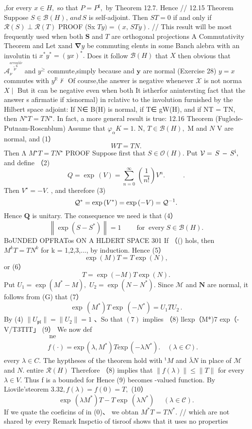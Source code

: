 ,for every $x\in H,$ so that $P=P^{\sharp},$ by Theorem 12.7. Hence // 12.15 Theorem Suppose $S\in{\mathcal{B}}(H),\,a n d\,S$ is self-adjoint. Then $S T=0$ if and only if ${\mathcal{R}}(S)\perp{\mathcal{R}}(T)$ PROOF (Sx $T y)=(x,\,S T y).$ // This result will be most frequently used when both $\boldsymbol{S}$ and ${\mathbf{}}T$ are orthogonal projections A Commutativity Theorem and Let xand $\mathbf{\nabla}y$ be commuting elents in some Banch alebra with an involutin ti $x^{*}y^{*}=(y x)^{*}.$ Does it follow ${\mathcal{B}}(H)$ that $X$ then obvious that $\mathcal{A}_{\nu}^{\stackrel{ arrow\tilde{\nu}\tilde{\nu}}{\tilde{\nu}^{6}}}$ and $y^{\geq}$ commute,simply because and $\boldsymbol{y}$ are normal (Exercise 28) $y=x$ commutes with $y^{\mathbb{R}}\not\vdash$ Of course,the answer is negative whenever $\textstyle{\mathcal{X}}$ is not norma $X\mid$ But it can be negative even when both It istherfor anintersting fact that the answer s afirmatie if xisnormal) in rclativc to the involution furnished by the Hilbert space adjoint: If N∈ B(H) is normal, if T∈ gW(H), and if NT = TN, then $N^{\star}T=T N^{\star}.$ In fact, a more general result is true: 12.16 Theorem (Fuglede-Putnam-Roscnblum) Assume that $\varphi_{\alpha}K=1.$ N, $T\in{\mathcal{B}}(H),$ M and $\textstyle N$ V are normal, and (1） $$ W T=T N. $$ Then Λ $M^{\star}T=T N^{\star}$ PROOF Suppose first that $S\in{\mathcal{O}}(H).$ Put ${\cal V}=\,S\,-\,S^{\mathrm{i}},$ and define （2) $$ Q=\exp\,(V)=\sum_{n=0}^{\infty}\,\left(\frac{1}{n!}\right)V^{n}.~~~~~~~~~~~~. $$ Then $V^{\star}=-V.$ , and therefore (3) $$ {\cal Q}^{*}=\exp\left(V^{*}\right)=\exp\left(-V\right)={\cal Q}^{-1}. $$ Hence ${\boldsymbol{Q}}$ is unitary. The consequence we need is that (4） $$ \left\|\exp\left(S-S^{*}\right)\right\|=1\qquad\operatorname{for}\operatorname{every}S\in{\mathcal{B}}(H). $$BoUNDED OPFRATos ON A HLDERT SPACE 301 If （() hols, then $M^{k}T=T N^{k}$ for k = 1,2,3,..., by induction. Hence (5） $$ \exp\left(M\right)T=T\exp\left(N\right)\!, $$ or (6） $$ T=\exp\left(-M\right)T\exp\left(N\right). $$ Put $U_{1}=\exp{(M^{*}-M)},$ $U_{2}=\exp\left(N-N^{*}\right).$ Since ${\mathcal{M}}$ and ${\boldsymbol{N}}$ are normal, it follows from (G) that (7） $$ \exp\,(M^{*})T\exp\,(-N^{*})=U_{1}T U_{2}\,. $$ By (4) $\|U_{\mathfrak{p l}}\|=\|U_{2}\|=1$ 、So that $(7)$ implies （8) llexp（M*)7 exp（-V/T3TIT」 (9） We now def $$ \begin{array}{l}{{\mathrm{~ne~}}}\\ {{f(\cdot)=\mathrm{exp}\,(\lambda,M^{*})T\mathrm{exp}\,(-\lambda N^{*}).\quad(\lambda\in C).}}\end{array}\quad $$ every $\lambda\in C.$ The hyptheses of the theorem hold with $^{\mathrm{t}}\!\!M$ and ${\bar{\lambda}}N$ in place of $\mathcal{M}$ and $N.$ entire ${\mathcal{R}}(H)$ Therefore （8) implies that $\|f(\lambda)\|\leq\|T\|$ for every $\lambda\in V.$ Thus f is a bounded for Hence (9) becomes -valued function. By Liovile'steorem $3.32,f(\lambda)=f(0)=T,$ (10） $$ \exp\,(\lambda M^{*})T-T\exp\,(\lambda N^{*})~~~~~~(\lambda\in{\mathcal{C}}). $$ If we quate the coeficins of in (0)、 we obtan $M^{\ast}T=T N^{\ast}.$ // which are not shared by every Remark Inspctio of tisroof shows that it uses no properties 